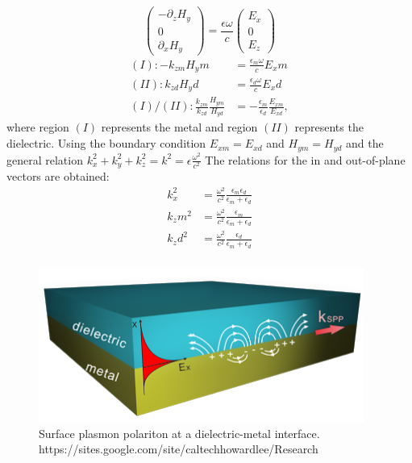 \begin{equation}
\begin{pmatrix}-\partial_zH_y\\0\\\partial_xH_y\end{pmatrix}
= \frac{\epsilon\omega}{c}
\begin{pmatrix}E_x\\0\\E_z\end{pmatrix}
\end{equation}
\begin{equation}
\begin{split}
(I): -k_{zm}H_ym &= \frac{\epsilon_m\omega}{c}E_xm \\
(II): k_{zd}H_yd &= \frac{\epsilon_d\omega}{c}E_xd \\
(I)/(II): \frac{k_{zm}}{k_{zd}}\frac{H_{ym}}{H_{yd}} &=-\frac{\epsilon_m}{\epsilon_d}\frac{E_{xm}}{E_{xd}},
\end{split}
\end{equation}
where region $(I)$ represents the metal and region $(II)$ represents the dielectric. Using the boundary condition $E_{xm} = E_{xd}$ and $H_{ym} = H_{yd}$ and the general relation $k_x^2+k_y^2+k_z^2 = k^2 = \epsilon\frac{\omega^2}{c^2}$
The relations for the in and out-of-plane vectors are obtained:
\begin{equation}
\begin{split}
k_x^2 &= \frac{\omega^2}{c^2}\frac{\epsilon_m\epsilon_d}{\epsilon_m+\epsilon_d}\\
k_zm^2 &= \frac{\omega^2}{c^2}\frac{\epsilon_m}{\epsilon_m+\epsilon_d}\\
k_zd^2 &= \frac{\omega^2}{c^2}\frac{\epsilon_d}{\epsilon_m+\epsilon_d}\\
\end{split}
\end{equation}
\begin{figure}[t!]
\centering
\includegraphics[width=0.95\textwidth]{SPP.png}
\caption{Surface plasmon polariton at a dielectric-metal interface. https://sites.google.com/site/caltechhowardlee/Research}
\end{figure}

